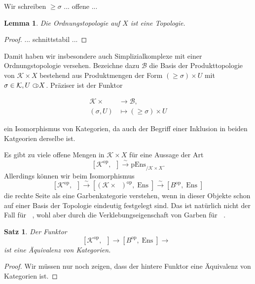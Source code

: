 \documentclass[a4paper]{article}
\newtheorem{lemma}[theorem]{Lemma}
\newtheorem{satz}[theorem]{Satz}
\DeclareMathOperator{\EnsX}{Ens_{/X}}
\DeclareMathOperator{\pEnsX}{pEns_{/X}}
\DeclareMathOperator{\OffX}{Off_X}
\DeclareMathOperator{\Ens}{Ens}
\newcommand{\op}{\mathrm{op}}
\newcommand{\iso}{\xrightarrow{\sim}}
\newcommand{\open}{\subset\kern-0.58em\circ}  %
\begin{document}
Wir schreiben $\geq \sigma$ ... offene ...

\begin{lemma}
  Die Ordnungstopologie auf $X$ ist eine Topologie.
\end{lemma}

\begin{proof}
  ... schnittstabil ...
\end{proof}

Damit haben wir insbesondere auch Simplizialkomplexe mit einer
Ordnungstopologie versehen. Bezeichne dazu $\mathcal{B}$ die Basis der
Produkttopologie von $\mathcal{K} \times X$ bestehend aus
Produktmengen der Form $(\geq \sigma) \times U$ mit $\sigma \in
\mathcal{K}, U \open X$. Präziser ist der Funktor
  
\begin{align*}
  \mathcal{K} \times \OffX &\to \mathcal{B}, \\
  (\sigma, U) &\mapsto (\geq \sigma) \times U
\end{align*}

ein Isomorphismus von Kategorien, da auch der Begriff einer Inklusion
in beiden Katgeorien derselbe ist.

Es gibt zu viele offene Mengen in $\mathcal{K} \times X$ für eine
Aussage der Art
\[
  [\mathcal{K}^\op, \pEnsX] \iso \mathrm{pEns}_{/\mathcal{K} \times X}.
\]
Allerdings können wir beim Isomorphismus
\[
  [\mathcal{K}^\op, \pEnsX] \iso [(\mathcal{K} \times \OffX)^\op, \Ens] \iso [B^\op, \Ens]
\]
die rechte Seite als eine Garbenkategorie verstehen, wenn in dieser
Objekte schon auf einer Basis der Topologie eindeutig festgelegt
sind. Das ist natürlich nicht der Fall für $\pEnsX$, wohl aber durch
die Verklebungseigenschaft von Garben für $\EnsX$.

\begin{satz}
  Der Funktor
  \[
  [\mathcal{K}^\op, \EnsX] \to [B^\op, \Ens] \to \EnsX
  \]
  ist eine Äquivalenz von Kategorien.
\end{satz}
\begin{proof}
  Wir müssen nur noch zeigen, dass der hintere Funktor eine Äquivalenz
  von Kategorien ist.

  
\end{proof}
\end{document}
